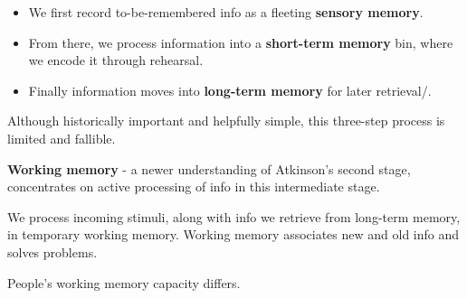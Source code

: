 \documentclass[12pt]{article}
\begin{document}
\begin{itemize}
  \item We first record to-be-remembered info as a fleeting \textbf{sensory memory}.
  \item From there, we process information into a \textbf{short-term memory} bin, where we encode it through rehearsal.
  \item Finally information moves into \textbf{long-term memory} for later retrieval/.
\end{itemize}

Although historically important and helpfully simple, this three-step process is limited and fallible. 

\textbf{Working memory} - a newer understanding of Atkinson's second stage, concentrates on active processing of info in this intermediate stage.

We process incoming stimuli, along with info we retrieve from long-term memory, in temporary working memory. Working memory associates new and old info and solves problems.

People's working memory capacity differs.
\end{document}
